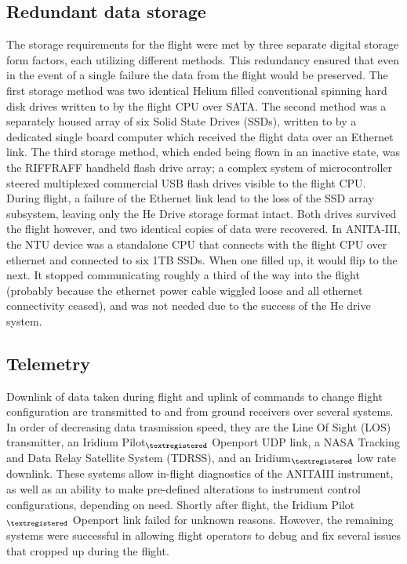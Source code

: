 	\subsection{Redundant data storage}
		The storage requirements for the flight were met by three separate digital storage form factors, each utilizing different methods.  This redundancy ensured that even in the event of a single failure the data from the flight would be preserved.  The first storage method was two identical Helium filled conventional spinning hard disk drives written to by the flight CPU over SATA.  The second method was a separately housed array of six Solid State Drives (SSDs), written to by a dedicated single board computer which received the flight data over an Ethernet link.  The third storage method, which ended being flown in an inactive state, was the RIFFRAFF handheld flash drive array; a complex system of microcontroller steered multiplexed commercial USB flash drives visible to the flight CPU.  During flight, a failure of the Ethernet link lead to the loss of the SSD array subsystem, leaving only the He Drive storage format intact.  Both drives survived the flight however, and two identical copies of data were recovered.
		In ANITA-III, the NTU device was a standalone CPU that connects with the flight CPU over ethernet and connected to six 1TB SSDs.  When one filled up, it would flip to the next.  It stopped communicating roughly a third of the way into the flight (probably because the ethernet power cable wiggled loose and all ethernet connectivity ceased), and was not needed due to the success of the He drive system.
		
	
	\subsection{Telemetry}
		Downlink of data taken during flight and uplink of commands to change flight configuration are transmitted to and from ground receivers over several systems.  In order of decreasing data trasmission speed, they are the Line Of Sight (LOS) transmitter, an Iridium Pilot$_{\textregistered}$ Openport UDP link, a NASA Tracking and Data Relay Satellite System (TDRSS), and an Iridium$_{\textregistered}$ low rate downlink.  These systems allow in-flight diagnostics of the ANITAIII instrument, as well as an ability to make pre-defined alterations to instrument control configurations, depending on need.  Shortly after flight, the Iridium Pilot$_{\textregistered}$ Openport link failed for unknown reasons.  However, the remaining systems were successful in allowing flight operators to debug and fix several issues that cropped up during the flight.  %
		
